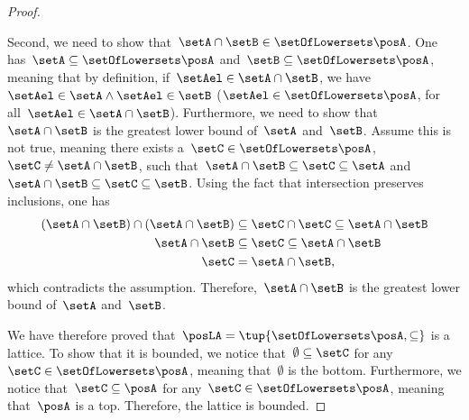 \begin{proof}
\begin{compactitem}
        \item Second, we need to show that~$\setA\cap \setB\in \setOfLowersets \posA$.
        One has~$\setA\subseteq \setOfLowersets \posA$ and~$\setB\subseteq \setOfLowersets \posA$, meaning that by definition, if~$\setAel\in \setA\cap \setB$, we have~$\setAel \in \setA\wedge \setAel\in \setB$ ($\setAel\in \setOfLowersets \posA$, for all~$\setAel\in \setA\cap \setB$).
        Furthermore, we need to show that~$\setA\cap \setB$ is the greatest lower bound of~$\setA$ and~$\setB$.
        Assume this is not true, meaning there exists a~$\setC\in \setOfLowersets \posA$,~$\setC\neq \setA\cap \setB$, such that~$\setA\cap \setB\subseteq \setC\subseteq \setA$ and~$\setA\cap \setB\subseteq \setC\subseteq \setB$.
        Using the fact that intersection preserves inclusions, one has
        \begin{equation}
            \begin{aligned}
            (\setA\cap \setB)
                \cap (\setA\cap \setB) &\subseteq \setC \cap \setC \subseteq \setA\cap \setB\\
                \setA\cap \setB &\subseteq \setC\subseteq \setA\cap \setB\\
                \setC&=\setA\cap \setB,
            \end{aligned}
        \end{equation}
        which contradicts the assumption.
        Therefore,~$\setA\cap \setB$ is the greatest lower bound of~$\setA$ and~$\setB$.
    \end{compactitem}
    We have therefore proved that~$\posLA=\tup{\setOfLowersets \posA,\subseteq}$ is a lattice.
    To show that it is bounded, we notice that~$\emptyset \subseteq \setC$ for any~$\setC\in \setOfLowersets \posA$, meaning that~$\emptyset$ is the bottom.
    Furthermore, we notice that~$\setC\subseteq \posA$ for any~$\setC\in \setOfLowersets \posA$, meaning that~$\posA$ is a top.
    Therefore, the lattice is bounded.
\end{proof}
